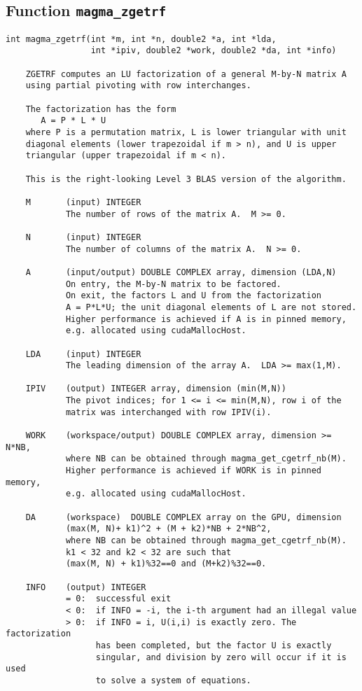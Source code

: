 \documentclass[10pt]{book}
\begin{document}
\newpage
\subsection{Function {\tt {\bf magma\_zgetrf}}}
\begin{verbatim}
int magma_zgetrf(int *m, int *n, double2 *a, int *lda, 
                 int *ipiv, double2 *work, double2 *da, int *info)
   
    ZGETRF computes an LU factorization of a general M-by-N matrix A   
    using partial pivoting with row interchanges.   

    The factorization has the form   
       A = P * L * U   
    where P is a permutation matrix, L is lower triangular with unit   
    diagonal elements (lower trapezoidal if m > n), and U is upper   
    triangular (upper trapezoidal if m < n).   

    This is the right-looking Level 3 BLAS version of the algorithm.   

    M       (input) INTEGER   
            The number of rows of the matrix A.  M >= 0.   

    N       (input) INTEGER   
            The number of columns of the matrix A.  N >= 0.   

    A       (input/output) DOUBLE COMPLEX array, dimension (LDA,N)   
            On entry, the M-by-N matrix to be factored.   
            On exit, the factors L and U from the factorization   
            A = P*L*U; the unit diagonal elements of L are not stored.   
            Higher performance is achieved if A is in pinned memory, 
            e.g. allocated using cudaMallocHost.

    LDA     (input) INTEGER   
            The leading dimension of the array A.  LDA >= max(1,M).   

    IPIV    (output) INTEGER array, dimension (min(M,N))   
            The pivot indices; for 1 <= i <= min(M,N), row i of the   
            matrix was interchanged with row IPIV(i).   

    WORK    (workspace/output) DOUBLE COMPLEX array, dimension >= N*NB,
            where NB can be obtained through magma_get_cgetrf_nb(M).
            Higher performance is achieved if WORK is in pinned memory, 
            e.g. allocated using cudaMallocHost.

    DA      (workspace)  DOUBLE COMPLEX array on the GPU, dimension 
            (max(M, N)+ k1)^2 + (M + k2)*NB + 2*NB^2,
            where NB can be obtained through magma_get_cgetrf_nb(M).
            k1 < 32 and k2 < 32 are such that 
            (max(M, N) + k1)%32==0 and (M+k2)%32==0.

    INFO    (output) INTEGER   
            = 0:  successful exit   
            < 0:  if INFO = -i, the i-th argument had an illegal value   
            > 0:  if INFO = i, U(i,i) is exactly zero. The factorization   
                  has been completed, but the factor U is exactly   
                  singular, and division by zero will occur if it is used   
                  to solve a system of equations.   
\end{verbatim}
\end{document}
